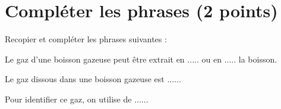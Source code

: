 \section{Compléter les phrases (2 points)}

Recopier et compléter les phrases suivantes :
\begin{questions}
	\question Le gaz d'une boisson gazeuse peut être extrait en $.....$ ou en $.....$ la boisson.
	
	\question Le gaz dissous dans une boisson gazeuse est $.....$.
	
	
	\question Pour identifier ce gaz, on utilise de $.....$.
\end{questions}